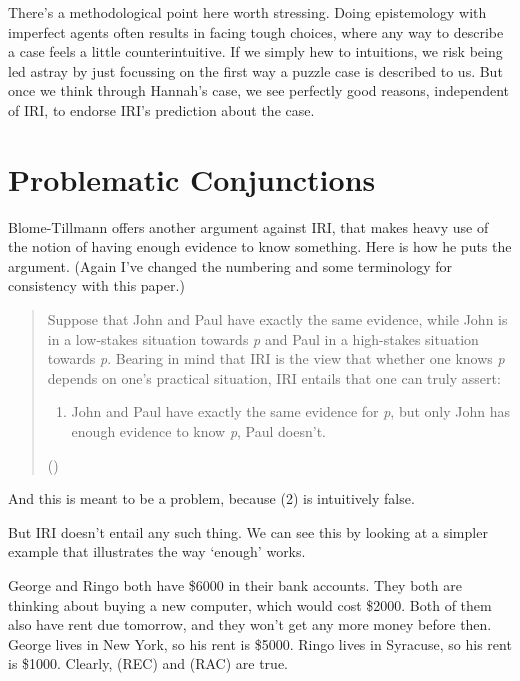 \documentclass[
  11pt,
  letterpaper,
  DIV=11,
  numbers=noendperiod,
  twoside]{scrartcl}
\providecommand{\tightlist}{%
  \setlength{\itemsep}{0pt}\setlength{\parskip}{0pt}}
\begin{document}
There's a methodological point here worth stressing. Doing epistemology
with imperfect agents often results in facing tough choices, where any
way to describe a case feels a little counterintuitive. If we simply hew
to intuitions, we risk being led astray by just focussing on the first
way a puzzle case is described to us. But once we think through Hannah's
case, we see perfectly good reasons, independent of IRI, to endorse
IRI's prediction about the case.

\section{Problematic Conjunctions}\label{sect:conj}

Blome-Tillmann offers another argument against IRI, that makes heavy use
of the notion of having enough evidence to know something. Here is how
he puts the argument. (Again I've changed the numbering and some
terminology for consistency with this paper.)

\begin{quote}
Suppose that John and Paul have exactly the same evidence, while John is
in a low-stakes situation towards \emph{p} and Paul in a high-stakes
situation towards \emph{p}. Bearing in mind that IRI is the view that
whether one knows \emph{p} depends on one's practical situation, IRI
entails that one can truly assert:

\begin{enumerate}
\def\labelenumi{\arabic{enumi}.}
\setcounter{enumi}{1}
\tightlist
\item
  John and Paul have exactly the same evidence for \emph{p}, but only
  John has enough evidence to know \emph{p}, Paul doesn't.
\end{enumerate}

()
\end{quote}

And this is meant to be a problem, because (2) is intuitively false.

But IRI doesn't entail any such thing. We can see this by looking at a
simpler example that illustrates the way `enough' works.

George and Ringo both have \$6000 in their bank accounts. They both are
thinking about buying a new computer, which would cost \$2000. Both of
them also have rent due tomorrow, and they won't get any more money
before then. George lives in New York, so his rent is \$5000. Ringo
lives in Syracuse, so his rent is \$1000. Clearly, (REC) and (RAC) are
true.
\end{document}
